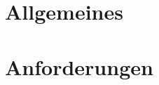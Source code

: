 \documentclass[10pt,a4paper,twoside]{article}
\begin{document}


\setcounter{tocdepth}{5} %
\setcounter{secnumdepth}{5} %
\tableofcontents
\newpage 
\section{Allgemeines}

\section{Anforderungen}

\newpage
\appendix
\listoffigures
\listoftables

\newpage
\renewcommand{\refname}{Quellenverzeichnis} 


\end{document}

